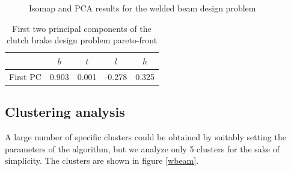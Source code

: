 \begin{figure}[ht]\begin{center}
 \caption{Isomap and PCA results for the welded beam design problem}
 \label{wbeamWholeVar}
\end{center}\end{figure}


\begin{table}[!ht]
  \centering
  \begin{tabular}{c|c|c|c|c|}
    \cline{2-5}    
    & $b$ & $t$ & $l$  & $h$ \\
    \hline
    \multicolumn{1}{|c|}{First PC} & 0.903 & 0.001 & -0.278 & 0.325\\
    \hline
  \end{tabular}
  \caption{First two principal components of the clutch brake design problem pareto-front}
  \label{firstWbeamPC}
\end{table}


\subsection{Clustering analysis}
A large number of specific clusters could be obtained by suitably setting
the parameters of the algorithm, but we analyze only 5 clusters for the
sake of simplicity. The clusters are shown in figure \ref{wbeam}.

